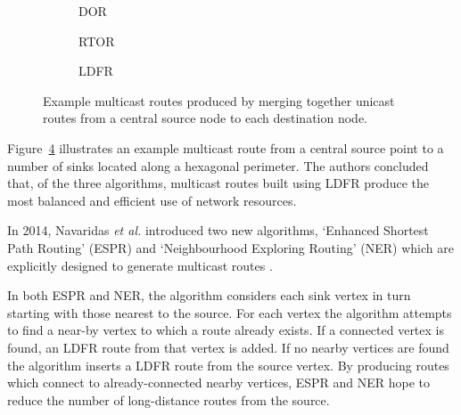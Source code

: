 			\begin{figure}
				\center
				\begin{subfigure}{0.3\linewidth}
					\center
					
					\caption{DOR}
					\label{fig:simple-routers-dor}
				\end{subfigure}
				\begin{subfigure}{0.3\linewidth}
					\center
					
					\caption{RTOR}
					\label{fig:simple-routers-dor}
				\end{subfigure}
				\begin{subfigure}{0.3\linewidth}
					\center
					
					\caption{LDFR}
					\label{fig:simple-routers-dor}
				\end{subfigure}
				
				\caption{Example multicast routes produced by merging together unicast
				routes from a central source node to each destination node.}
				\label{fig:simple-routers}
			\end{figure}
			
			Figure~\ref{fig:simple-routers} illustrates an example multicast route
			from a central source point to a number of sinks located along a
			hexagonal perimeter. The authors concluded that, of the three algorithms,
			multicast routes built using LDFR produce the most balanced and efficient
			use of network resources.
			
			In 2014, Navaridas \emph{et al.} introduced two new algorithms, `Enhanced
			Shortest Path Routing' (ESPR) and `Neighbourhood Exploring Routing' (NER)
			which are explicitly designed to generate multicast routes
			\cite{navaridas14}.
			
			In both ESPR and NER, the algorithm considers each sink vertex in turn
			starting with those nearest to the source. For each vertex the algorithm
			attempts to find a near-by vertex to which a route already exists. If a
			connected vertex is found, an LDFR route from that vertex is added. If no
			nearby vertices are found the algorithm inserts a LDFR route from the
			source vertex. By producing routes which connect to already-connected
			nearby vertices, ESPR and NER hope to reduce the number of long-distance
			routes from the source.
			
